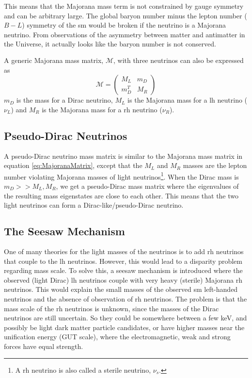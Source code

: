\documentclass[a4paper, american, 12pt]{report}
\begin{document}
	This means that the Majorana mass term is not constrained by gauge symmetry and can be arbitrary large. The global baryon number minus the lepton number ($B-L$) symmetry of the \acrshort{sm} would be broken if the neutrino is a Majorana neutrino. From observations of the asymmetry between matter and antimatter in the Universe, it actually looks like the baryon number is not conserved. 
	
	A generic Majorana mass matrix, $\mathcal{M}$, with three neutrinos can also be expressed as 
	\begin{equation}
	\label{eq:MajoranaMatrix}
		\mathcal{M}=\begin{pmatrix}
			M_{L} & m_D \\ m_D^T & M_R
		\end{pmatrix}
	\end{equation}
	$m_D$ is the mass for a Dirac neutrino, $M_L$ is the Majorana mass for a \acrshort{lh} neutrino ($\nu_L$) and $M_R$ is the Majorana mass for a \acrshort{rh} neutrino ($\nu_R$).
	
	
	\subsection{Pseudo-Dirac Neutrinos}
	\label{subsect:Theory-PseudoDiracN}
	A pseudo-Dirac neutrino\cite{chang2000pseudo}\cite{balaji2002revisiting} mass matrix is similar to the Majorana mass matrix in equation \ref{eq:MajoranaMatrix}, except that the $M_L$ and $M_R$ masses are the lepton number violating Majorana masses of light neutrinos\footnote{A \acrshort{rh} neutrino is also called a sterile neutrino, $\nu_s$.}. When the Dirac mass is $m_D>>M_L,M_R$, we get a pseudo-Dirac mass matrix where the eigenvalues of the resulting mass eigenstates are close to each other. This means that the two light neutrinos can form a Dirac-like/pseudo-Dirac neutrino.
	
	
	\subsection{The Seesaw Mechanism}
	\label{subsect:Theory-Seesaw}
	One of many theories for the light masses of the neutrinos is to add \acrshort{rh} neutrinos that couple to the \acrshort{lh} neutrinos. However, this would lead to a disparity problem regarding mass scale. To solve this, a seesaw mechanism is introduced where the observed (light Dirac) \acrshort{lh} neutrinos couple with very heavy (sterile) Majorana \acrshort{rh} neutrinos. This would explain the small masses of the observed \acrshort{sm} left-handed neutrinos and the absence of observation of \acrshort{rh} neutrinos. The problem is that the mass scale of the \acrshort{rh} neutrinos is unknown, since the masses of the Dirac neutrinos are still uncertain. So they could be somewhere between a few keV, and possibly be light dark matter particle candidates, or have higher masses near the unification energy (GUT scale), where the electromagnetic, weak and strong forces have equal strength.
	
\end{document}
